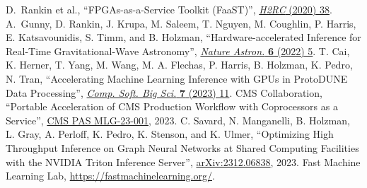 \begin{thebibliography}{99}
 D.~Rankin et al., ``FPGAs-as-a-Service Toolkit (FaaST)'', \href{https://doi.org/10.1109/H2RC51942.2020.00010}{\textit{H2RC} (2020) 38}.
 A.~Gunny, D. Rankin, J. Krupa, M. Saleem, T. Nguyen, M. Coughlin, P. Harris, E. Katsavounidis, S. Timm, and B. Holzman, ``Hardware-accelerated Inference for Real-Time Gravitational-Wave Astronomy'', \href{https://doi.org/10.1038/s41550-022-01651-w}{\textit{Nature Astron.} \textbf{6} (2022) 5}.
 T. Cai, K. Herner, T. Yang, M. Wang, M. A. Flechas, P. Harris, B. Holzman, K. Pedro, N. Tran, ``Accelerating Machine Learning Inference with GPUs in ProtoDUNE Data Processing'', \href{https://doi.org/10.1007/s41781-023-00101-0}{\textit{Comp. Soft. Big Sci.} \textbf{7} (2023) 11}.
 CMS Collaboration, ``Portable Acceleration of CMS Production Workflow with Coprocessors as a Service'', \href{http://cds.cern.ch/record/2872973}{CMS PAS MLG-23-001}, 2023.
 C. Savard, N. Manganelli, B. Holzman, L. Gray, A. Perloff, K. Pedro, K. Stenson, and K. Ulmer, ``Optimizing High Throughput Inference on Graph Neural Networks at Shared Computing Facilities with the NVIDIA Triton Inference Server'', \href{https://arxiv.org/abs/2312.06838}{arXiv:2312.06838}, 2023.
 Fast Machine Learning Lab, \href{https://fastmachinelearning.org/}{https://fastmachinelearning.org/}.
\end{thebibliography}
